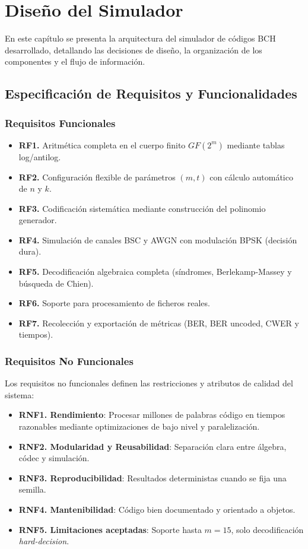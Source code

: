 \chapter{Diseño del Simulador}
\label{cap:diseno}

En este capítulo se presenta la arquitectura del simulador de códigos BCH desarrollado, detallando las decisiones de diseño, la organización de los componentes y el flujo de información.

\section{Especificación de Requisitos y Funcionalidades}

\subsection{Requisitos Funcionales}

\begin{itemize}
    \item \textbf{RF1.} Aritmética completa en el cuerpo finito $GF(2^m)$ mediante tablas log/antilog.
    \item \textbf{RF2.} Configuración flexible de parámetros $(m, t)$ con cálculo automático de $n$ y $k$.
    \item \textbf{RF3.} Codificación sistemática mediante construcción del polinomio generador.
    \item \textbf{RF4.} Simulación de canales BSC y AWGN con modulación BPSK (decisión dura).
    \item \textbf{RF5.} Decodificación algebraica completa (síndromes, Berlekamp-Massey y búsqueda de Chien).
    \item \textbf{RF6.} Soporte para procesamiento de ficheros reales.
    \item \textbf{RF7.} Recolección y exportación de métricas (BER, BER uncoded, CWER y tiempos).
\end{itemize}

\subsection{Requisitos No Funcionales}
Los requisitos no funcionales definen las restricciones y atributos de calidad del sistema:
\begin{itemize}
    \item \textbf{RNF1. Rendimiento}: Procesar millones de palabras código en tiempos razonables mediante optimizaciones de bajo nivel y paralelización.
    \item \textbf{RNF2. Modularidad y Reusabilidad}: Separación clara entre álgebra, códec y simulación.
    \item \textbf{RNF3. Reproducibilidad}: Resultados deterministas cuando se fija una semilla.
    \item \textbf{RNF4. Mantenibilidad}: Código bien documentado y orientado a objetos.
    \item \textbf{RNF5. Limitaciones aceptadas}: Soporte hasta $m=15$, solo decodificación \textit{hard-decision}.
\end{itemize}
    

